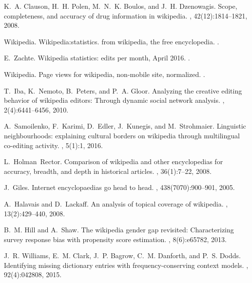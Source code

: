 \documentclass[pre,twocolumn,twoside,byrevtex,superscriptaddress,floatfix]{revtex4-1}
\begin{document}
\begin{thebibliography}{10}

K.~A. Clauson, H.~H. Polen, M.~N.~K. Boulos, and J.~H. Dzenowagis.
\newblock Scope, completeness, and accuracy of drug information in wikipedia.
, 42(12):1814--1821, 2008.

Wikipedia.
\newblock Wikipedia:statistics. from wikipedia, the free encyclopedia.
.

E.~Zachte.
\newblock Wikipedia statistics: edits per month, April 2016.
.

Wikipedia.
\newblock Page views for wikipedia, non-mobile site, normalized.
.

T.~Iba, K.~Nemoto, B.~Peters, and P.~A. Gloor.
\newblock Analyzing the creative editing behavior of wikipedia editors: Through
  dynamic social network analysis.
, 2(4):6441--6456, 2010.

A.~Samoilenko, F.~Karimi, D.~Edler, J.~Kunegis, and M.~Strohmaier.
\newblock Linguistic neighbourhoods: explaining cultural borders on wikipedia
  through multilingual co-editing activity.
, 5(1):1, 2016.

L.~Holman~Rector.
\newblock Comparison of wikipedia and other encyclopedias for accuracy,
  breadth, and depth in historical articles.
, 36(1):7--22, 2008.

J.~Giles.
\newblock Internet encyclopaedias go head to head.
, 438(7070):900--901, 2005.

A.~Halavais and D.~Lackaff.
\newblock An analysis of topical coverage of wikipedia.
, 13(2):429--440,
  2008.

B.~M. Hill and A.~Shaw.
\newblock The wikipedia gender gap revisited: Characterizing survey response
  bias with propensity score estimation.
, 8(6):e65782, 2013.

J.~R. Williams, E.~M. Clark, J.~P. Bagrow, C.~M. Danforth, and P.~S. Dodds.
\newblock Identifying missing dictionary entries with frequency-conserving
  context models.
, 92(4):042808, 2015.


\end{thebibliography}
\end{document}
